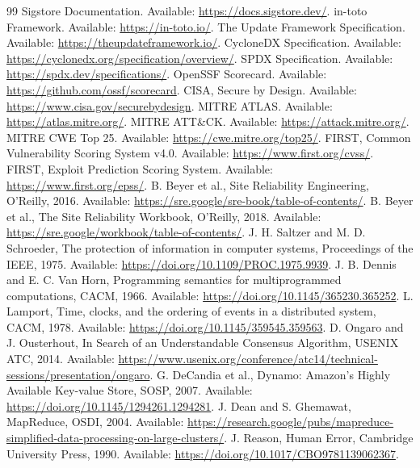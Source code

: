 \documentclass[10pt,journal,onecolumn]{IEEEtran}
\begin{document}
\begin{thebibliography}{99}
 Sigstore Documentation. Available: \url{https://docs.sigstore.dev/}.
 in-toto Framework. Available: \url{https://in-toto.io/}.
 The Update Framework Specification. Available: \url{https://theupdateframework.io/}.
 CycloneDX Specification. Available: \url{https://cyclonedx.org/specification/overview/}.
 SPDX Specification. Available: \url{https://spdx.dev/specifications/}.
 OpenSSF Scorecard. Available: \url{https://github.com/ossf/scorecard}.
 CISA, Secure by Design. Available: \url{https://www.cisa.gov/securebydesign}.
 MITRE ATLAS. Available: \url{https://atlas.mitre.org/}.
 MITRE ATT\&CK. Available: \url{https://attack.mitre.org/}.
 MITRE CWE Top 25. Available: \url{https://cwe.mitre.org/top25/}.
 FIRST, Common Vulnerability Scoring System v4.0. Available: \url{https://www.first.org/cvss/}.
 FIRST, Exploit Prediction Scoring System. Available: \url{https://www.first.org/epss/}.
 B. Beyer et al., Site Reliability Engineering, O'Reilly, 2016. Available: \url{https://sre.google/sre-book/table-of-contents/}.
 B. Beyer et al., The Site Reliability Workbook, O'Reilly, 2018. Available: \url{https://sre.google/workbook/table-of-contents/}.
 J. H. Saltzer and M. D. Schroeder, The protection of information in computer systems, Proceedings of the IEEE, 1975. Available: \url{https://doi.org/10.1109/PROC.1975.9939}.
 J. B. Dennis and E. C. Van Horn, Programming semantics for multiprogrammed computations, CACM, 1966. Available: \url{https://doi.org/10.1145/365230.365252}.
 L. Lamport, Time, clocks, and the ordering of events in a distributed system, CACM, 1978. Available: \url{https://doi.org/10.1145/359545.359563}.
 D. Ongaro and J. Ousterhout, In Search of an Understandable Consensus Algorithm, USENIX ATC, 2014. Available: \url{https://www.usenix.org/conference/atc14/technical-sessions/presentation/ongaro}.
 G. DeCandia et al., Dynamo: Amazon's Highly Available Key-value Store, SOSP, 2007. Available: \url{https://doi.org/10.1145/1294261.1294281}.
 J. Dean and S. Ghemawat, MapReduce, OSDI, 2004. Available: \url{https://research.google/pubs/mapreduce-simplified-data-processing-on-large-clusters/}.
 J. Reason, Human Error, Cambridge University Press, 1990. Available: \url{https://doi.org/10.1017/CBO9781139062367}.

\end{thebibliography}
\end{document}
